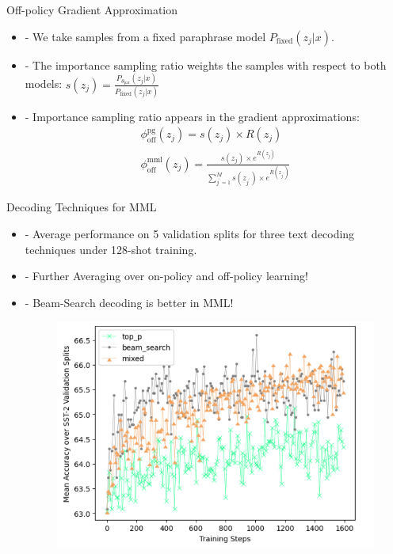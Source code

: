 \documentclass{beamer}
\begin{document}
\begin{frame}{Off-policy Gradient Approximation}
\begin{itemize}
        \item - We take samples from a fixed paraphrase model $P_{\text{fixed}}(z_{j}|x)$.
        \medskip
        \medskip
        \medskip
        \item
        - The importance sampling ratio weights the samples with respect to both models: $s(z_{j}) = \frac{P_{\theta_{\text{par}}}(z_{j}|x)}{P_{\text{fixed}}(z_{j}|x)}$
        \medskip
        \medskip
        \medskip
        \item - Importance sampling ratio appears in the gradient approximations:
        \begin{multline}
\phi^{\text{pg}}_{\text{off}}(z_{j}) = s(z_{j}) \times R(z_{j})\\
\phi^{\text{mml}}_{\text{off}}(z_{j}) = \frac{s(z_{j}) \times e^{R(z_{j})}}{\sum^{M}_{j^{'}=1} s(z_{j^{'}}) \times e^{R(z_{j^{'}})}}
\label{off-pg-mml-objective}
\end{multline}
\end{itemize}
\end{frame}

\begin{frame}{Decoding Techniques for MML}
\begin{itemize}
        \item - Average performance on 5 validation splits for three text decoding techniques under 128-shot training.
        \medskip
        \medskip
        \item - Further Averaging over on-policy and off-policy learning!
        \medskip
        \medskip
        \item - {\color{green}Beam-Search decoding} is better in MML!
        \begin{figure}
        \centering
        \includegraphics[width=0.7\linewidth]{decoding_in_mml.png}
    \end{figure}
\end{itemize}
\end{frame}
\end{document}
